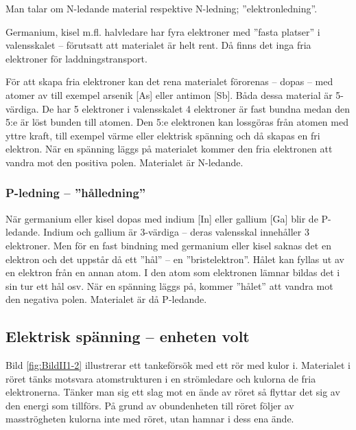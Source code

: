 Man talar om N-ledande material respektive N-led\-ni\-ng; ''elektronled\-ni\-ng''.

Germanium, kisel m.fl. halvledare har fyra elektroner med ''fasta platser'' i
valensskalet -- förutsatt att materialet är helt rent.
Då finns det inga fria elektroner för laddningstransport.

För att skapa fria elektroner kan det rena materialet förorenas -- dopas -- med
atomer av till exempel arsenik [As] eller antimon [Sb].
Båda dessa material är 5-värdiga.
De har 5 elektroner i valensskalet 4 elektroner är fast bundna medan
den 5:e är löst bunden till atomen.
Den 5:e elektronen kan lossgöras från atomen med yttre kraft, till exempel värme eller
elektrisk spänning och då skapas en fri elektron.
När en spänning läggs på materialet kommer den fria elektronen att vandra mot
den positiva polen.
Materialet är N-ledande.

\subsubsection{P-ledning -- ''hålledning''}

När germanium eller kisel dopas med indium [In] eller gallium [Ga] blir de
P-ledande.
Indium och gallium är 3-värdiga -- deras valensskal innehåller 3 elektroner.
Men för en fast bindning med germanium eller kisel saknas det en elektron och
det uppstår då ett ''hål'' -- en ''bristelektron''.
Hålet kan fyllas ut av en elektron från en annan atom.
I den atom som elektronen lämnar bildas det i sin tur ett hål osv.
När en spänning läggs på, kommer ''hålet'' att vandra mot den negativa polen.
Materialet är då P-ledande.

\subsection{Elektrisk spänning -- enheten volt}
\label{spänning}


Bild \ref{fig:BildII1-2} illustrerar ett tankeförsök med ett rör med kulor i.
Materialet i röret tänks motsvara atomstrukturen i en strömledare och kulorna
de fria elektronerna.
Tänker man sig ett slag mot en ände av röret så flyttar det sig av den energi
som tillförs.
På grund av obundenheten till röret följer av masströgheten kulorna inte med
röret, utan hamnar i dess ena ände.

